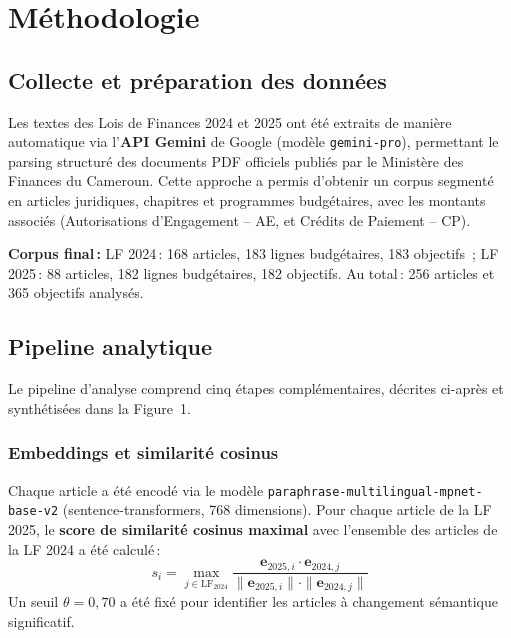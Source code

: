 \documentclass[12pt, a4paper]{article}
\begin{document}
\section{Méthodologie}

\subsection{Collecte et préparation des données}

Les textes des Lois de Finances 2024 et 2025 ont été extraits de manière automatique via l'\textbf{API 
Gemini} de Google (modèle \texttt{gemini-pro}), permettant le parsing structuré des documents PDF 
officiels publiés par le Ministère des Finances du Cameroun. Cette approche a permis d'obtenir un 
corpus segmenté en articles juridiques, chapitres et programmes budgétaires, avec les montants 
associés (Autorisations d'Engagement -- AE, et Crédits de Paiement -- CP).

\begin{keybox}
\small\textbf{Corpus final\,:} LF 2024\,: 168 articles, 183 lignes budgétaires, 183 objectifs~; 
LF 2025\,: 88 articles, 182 lignes budgétaires, 182 objectifs. Au total\,: 256 articles et 365 objectifs analysés.
\end{keybox}

\subsection{Pipeline analytique}

Le pipeline d'analyse comprend cinq étapes complémentaires, décrites ci-après et synthétisées 
dans la Figure~1.

\subsubsection{Embeddings et similarité cosinus}

Chaque article a été encodé via le modèle \texttt{paraphrase-multilingual-mpnet-base-v2} 
(sentence-transformers, 768 dimensions). Pour chaque article de la LF 2025, le \textbf{score 
de similarité cosinus maximal} avec l'ensemble des articles de la LF 2024 a été calculé\,:
\[
  s_i = \max_{j \in \text{LF}_{2024}} \frac{\mathbf{e}_{2025,i} \cdot \mathbf{e}_{2024,j}}
  {\|\mathbf{e}_{2025,i}\| \cdot \|\mathbf{e}_{2024,j}\|}
\]
Un seuil $\theta = 0{,}70$ a été fixé pour identifier les articles à changement sémantique significatif.
\end{document}
